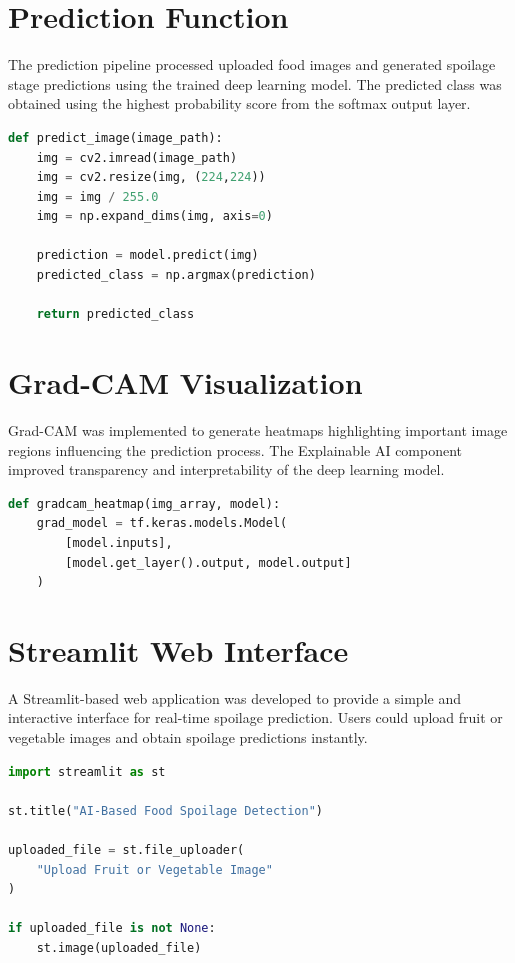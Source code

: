 \section[Prediction Function]{\textbf{Prediction Function}}
The prediction pipeline processed uploaded food images and generated spoilage stage predictions using the trained deep learning model. The predicted class was obtained using the highest probability score from the softmax output layer.

\begin{lstlisting}[language=Python, caption=Prediction function for multi-label classification]
def predict_image(image_path):
    img = cv2.imread(image_path)
    img = cv2.resize(img, (224,224))
    img = img / 255.0
    img = np.expand_dims(img, axis=0)

    prediction = model.predict(img)
    predicted_class = np.argmax(prediction)

    return predicted_class
\end{lstlisting}

\section[Grad-CAM Visualization]{\textbf{Grad-CAM Visualization}}
Grad-CAM was implemented to generate heatmaps highlighting important image regions influencing the prediction process. The Explainable AI component improved transparency and interpretability of the deep learning model.

\begin{lstlisting}[language=Python, caption=Grad-CAM heatmap implementation]
def gradcam_heatmap(img_array, model):
    grad_model = tf.keras.models.Model(
        [model.inputs],
        [model.get_layer().output, model.output]
    )
\end{lstlisting}

\section[Streamlit Web Interface]{\textbf{Streamlit Web Interface}}
A Streamlit-based web application was developed to provide a simple and interactive interface for real-time spoilage prediction. Users could upload fruit or vegetable images and obtain spoilage predictions instantly.

\begin{lstlisting}[language=Python, caption=Streamlit web application snippet]
import streamlit as st

st.title("AI-Based Food Spoilage Detection")

uploaded_file = st.file_uploader(
    "Upload Fruit or Vegetable Image"
)

if uploaded_file is not None:
    st.image(uploaded_file)
\end{lstlisting}

